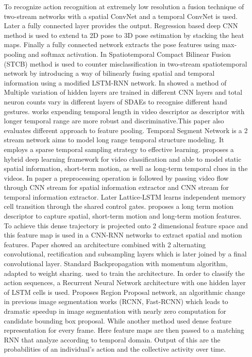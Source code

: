 \documentclass[11pt,english]{article}
\begin{document}
To recognize action recognition at extremely low resolution a fusion technique of two-stream networks\citep{chen2017semi} with a spatial ConvNet and a temporal ConvNet is used. Later a fully connected layer provides the output. Regression based deep CNN\citep{luvizon20182d} method is used to extend ta 2D pose to 3D pose estimation by stacking the heat maps. Finally a fully connected network extracts the pose features using max-pooling and softmax activation. In \citep{wang2017spatiotemporal} Spatiotemporal Compact Bilinear Fusion (STCB) method is used to counter misclassification in two-stream spatiotemporal network by introducing a way of bilinearly fusing spatial and temporal information using a modified LSTM-RNN network. In \citep{oyedotun2017deep} showed a method of Multiple variation of hidden layers are trained in different CNN layers and total neuron counts vary in different layers of SDAEs to recognise different hand gestures. \citep{yue2015beyond} works expending temporal length in video descriptor as descriptor with longer temporal range are more robust and discriminative.This paper also evaluates different approach to feature pooling. Temporal Segment Network \citep{wang2016temporal} is a 2 stream network aims to model long range temporal structure modeling. It employs a sparse temporal sampling strategy to effective learning. \citep{wu2015modeling} proposes a hybrid deep learning framework for video classification and able to model static spatial information, short-term motion, as well as long-term temporal clues in the videos. In paper \citep{sun2017lattice} a preprocessing operation is followed by  passing video flow through CNN stream for spatial information extractor and CNN stream for temporal information extractor. Later Lattice-LSTM learns independent memory cell transition through the shared control gates. \citep{shi2017sequential} proposes a long term motion descriptor to capture spatial, short-term motion and long-term motion features. To achieve this dense trajectory is projected onto 2 dimensional feature space and this feature map is used in a CNN-RNN networks to extract spatial and motion features. Paper \citep{baccouche2011sequential} showed an architecture combined with  2 alternating convolutional, rectification and subsampling layers which is later joined by a final convolutional layer. Standard Backpropagation with momentum algorithm, adapted to weight sharing. used to train the architecture.  In order to classify the action sequences, a Recurrent Neural Network architecture with one hidden layer of LSTM cells is used. \citep{he2016deep} Proposes Region Proposal network, an algorithmic change in previous image segmentation works (RCNN, Fast-RCNN) which leads to dramatic speedup in image segmentation with nearly zero computation for candidate bounding box proposal. While another method \citep{bagautdinov2017social} used dense feature representation for every frame. Here feature maps are then passed to a matching RNN that analyze according to temporal domain. Output of this are the probabilities of an individual's action and the collective activity over time.
\end{document}
